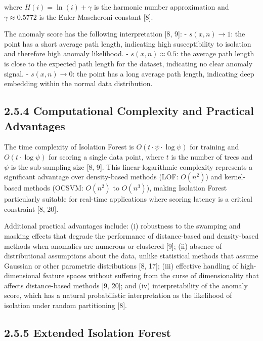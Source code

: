 \documentclass[
  a4paper]{report}
\begin{document}
where \(H(i) = \ln(i) + \gamma\) is the harmonic number approximation
and \(\gamma \approx 0.5772\) is the Euler-Mascheroni constant {[}8{]}.

The anomaly score has the following interpretation {[}8, 9{]}: -
\(s(x, n) \to 1\): the point has a short average path length, indicating
high susceptibility to isolation and therefore high anomaly likelihood.
- \(s(x, n) \approx 0.5\): the average path length is close to the
expected path length for the dataset, indicating no clear anomaly
signal. - \(s(x, n) \to 0\): the point has a long average path length,
indicating deep embedding within the normal data distribution.

\subsection{2.5.4 Computational Complexity and Practical
Advantages}\label{computational-complexity-and-practical-advantages}

The time complexity of Isolation Forest is
\(O(t \cdot \psi \cdot \log \psi)\) for training and
\(O(t \cdot \log \psi)\) for scoring a single data point, where \(t\) is
the number of trees and \(\psi\) is the sub-sampling size {[}8, 9{]}.
This linear-logarithmic complexity represents a significant advantage
over density-based methods (LOF: \(O(n^2)\)) and kernel-based methods
(OCSVM: \(O(n^2)\) to \(O(n^3)\)), making Isolation Forest particularly
suitable for real-time applications where scoring latency is a critical
constraint {[}8, 20{]}.

Additional practical advantages include: (i) robustness to the swamping
and masking effects that degrade the performance of distance-based and
density-based methods when anomalies are numerous or clustered {[}9{]};
(ii) absence of distributional assumptions about the data, unlike
statistical methods that assume Gaussian or other parametric
distributions {[}8, 17{]}; (iii) effective handling of high-dimensional
feature spaces without suffering from the curse of dimensionality that
affects distance-based methods {[}9, 20{]}; and (iv) interpretability of
the anomaly score, which has a natural probabilistic interpretation as
the likelihood of isolation under random partitioning {[}8{]}.

\subsection{2.5.5 Extended Isolation
Forest}\label{extended-isolation-forest}
\end{document}
